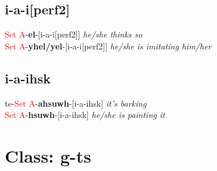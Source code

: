 \documentclass[oneside,openany]{book}%
\begin{document}
\subsection*{i-a-i[perf2]}%
\textcolor{Red}{Set A}{-}\textbf{el}{-}[i-a-i[perf2]] \textit{ he/she thinks so} \\%
\textcolor{Red}{Set A}{-}\textbf{yhel/yel}{-}[i-a-i[perf2]] \textit{ he/she is imitating him/her} \\%
\vspace{1em}%
\needspace{1in}%
\subsection*{i-a-ihsk}%
te{-}\textcolor{Red}{Set A}{-}\textbf{ahsuwh}{-}[i-a-ihsk] \textit{ it's barking} \\%
\textcolor{Red}{Set A}{-}\textbf{hsuwh}{-}[i-a-ihsk] \textit{ he/she is painting it} \\%
\vspace{1em}%
\needspace{3in}%
\section*{Class: g-ts}%
%
\needspace{1in}%
\end{document}

